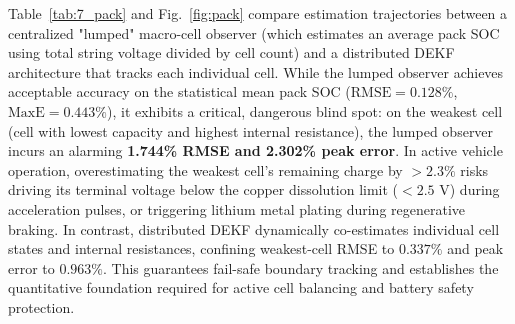 \documentclass[balance,nocopyright,upint,varvw,hyphenate,barcolor=NavyBlue,nolists]{asmejour}
\begin{document}
Table~\ref{tab:7_pack} and Fig.~\ref{fig:pack} compare estimation trajectories between a centralized "lumped" macro-cell observer (which estimates an average pack SOC using total string voltage divided by cell count) and a distributed DEKF architecture that tracks each individual cell. While the lumped observer achieves acceptable accuracy on the statistical mean pack SOC ($\text{RMSE} = 0.128\%$, $\text{MaxE} = 0.443\%$), it exhibits a critical, dangerous blind spot: on the weakest cell (cell with lowest capacity and highest internal resistance), the lumped observer incurs an alarming \textbf{1.744\% RMSE and 2.302\% peak error}. In active vehicle operation, overestimating the weakest cell's remaining charge by $> 2.3\%$ risks driving its terminal voltage below the copper dissolution limit ($< 2.5\text{ V}$) during acceleration pulses, or triggering lithium metal plating during regenerative braking. In contrast, distributed DEKF dynamically co-estimates individual cell states and internal resistances, confining weakest-cell RMSE to $0.337\%$ and peak error to $0.963\%$. This guarantees fail-safe boundary tracking and establishes the quantitative foundation required for active cell balancing and battery safety protection.

\begin{table}[t]
\caption{Embedded execution profiling on ARM Cortex-M architectures (compiled via ARM GCC 12.3 with -O3)\label{tab:8_embedded}}
%
\end{table}
\end{document}
